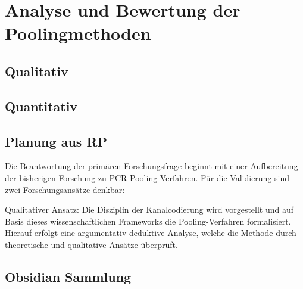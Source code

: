 \chapter{Analyse und Bewertung der Poolingmethoden}
\section{Qualitativ}
\cleardoublepage
\cleardoublepage

\section{Quantitativ}

\cleardoublepage
\cleardoublepage

\section{Planung aus RP}
Die Beantwortung der primären Forschungsfrage beginnt mit einer Aufbereitung der bisherigen Forschung zu PCR-Pooling-Verfahren.
Für die Validierung sind zwei Forschungsansätze denkbar:

Qualitativer Ansatz:
Die Disziplin der Kanalcodierung wird vorgestellt und auf Basis dieses wissenschaftlichen Frameworks die Pooling-Verfahren formalisiert.
Hierauf erfolgt eine argumentativ-deduktive Analyse, welche die Methode durch theoretische und qualitative Ansätze überprüft.


\section{Obsidian Sammlung}
